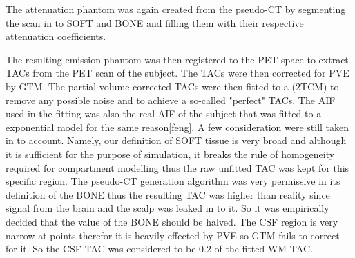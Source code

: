 The attenuation phantom was again created from the pseudo-CT by segmenting the scan in to SOFT and BONE and filling them with their respective attenuation coefficients.

The resulting emission phantom was then registered to the PET space to extract TACs from the PET scan of the subject.
The TACs were then corrected for PVE by GTM.
The partial volume corrected TACs were then fitted to a (2TCM) to remove any possible noise and to achieve a so-called "perfect" TACs.
The AIF used in the fitting was also the real AIF of the subject that was fitted to a exponential model for the same reason\ref{feng}.
A few consideration were still taken in to account.
Namely, our definition of SOFT tissue is very broad and although it is sufficient for the purpose of simulation, it breaks the rule of homogeneity required for compartment modelling thus the raw unfitted TAC was kept for this specific region.
The pseudo-CT generation algorithm was very permissive in its definition of the BONE thus the resulting TAC was higher than reality since signal from the brain and the scalp was leaked in to it.
So it was empirically decided that the value of the BONE should be halved.
The CSF region is very narrow at points therefor it is heavily effected by PVE so GTM fails to correct for it.
So the CSF TAC was considered to be 0.2 of the fitted WM TAC.

